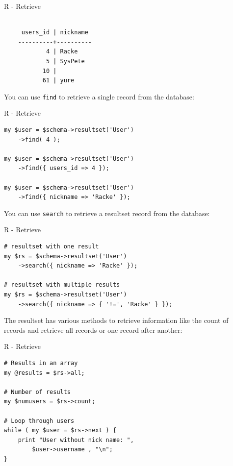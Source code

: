 \begin{frame}[fragile]{R - Retrieve}
\begin{lstlisting}

     users_id | nickname
    ----------+----------
            4 | Racke
            5 | SysPete
           10 |
           61 | yure

\end{lstlisting}
\end{frame}

You can use \verb|find| to retrieve a single record from
the database:

\begin{frame}[fragile]{R - Retrieve}
\begin{lstlisting}
my $user = $schema->resultset('User')
    ->find( 4 );

my $user = $schema->resultset('User')
    ->find({ users_id => 4 });

my $user = $schema->resultset('User')
    ->find({ nickname => 'Racke' });
\end{lstlisting}
\end{frame}


You can use \verb|search| to retrieve a resultset record from
the database:

\begin{frame}[fragile]{R - Retrieve}
\begin{lstlisting}
# resultset with one result
my $rs = $schema->resultset('User')
    ->search({ nickname => 'Racke' });

# resultset with multiple results
my $rs = $schema->resultset('User')
    ->search({ nickname => { '!=', 'Racke' } });
\end{lstlisting}
\end{frame}

The resultset has various methods to retrieve information
like the count of records and retrieve all records or
one record after another:

\begin{frame}[fragile]{R - Retrieve}
\begin{lstlisting}
# Results in an array
my @results = $rs->all;

# Number of results
my $numusers = $rs->count;

# Loop through users
while ( my $user = $rs->next ) {
    print "User without nick name: ",
        $user->username , "\n";
}
\end{lstlisting}
\end{frame}


